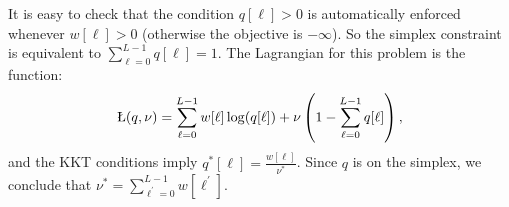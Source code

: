 \documentclass{IEEEtran}
\numberwithin{equation}{section}
\numberwithin{figure}{section}
\theoremstyle{plain}
\theoremstyle{definition}
\theoremstyle{remark}
\theoremstyle{plain}
\theoremstyle{remark}
\theoremstyle{plain}
\theoremstyle{plain}
\theoremstyle{remark}
\begin{document}
It is easy to check that the condition $q[\ell]> 0$ is automatically enforced whenever $w[\ell] > 0$ (otherwise the objective is $-\infty$). So the simplex constraint is equivalent to $\sum_{\ell=0}^{L-1}q[\ell] = 1$. The Lagrangian for this problem is the function:
%
\begin{align*}
%
\L(q,\nu) = \sum_{\ell=0}^{L-1} w[\ell] \log(q[\ell]) + \nu \left(1 - \sum_{\ell=0}^{L-1} q[\ell] \right),
%
\end{align*}
%
and the KKT conditions imply $q^*[\ell] = \frac{w[\ell]}{\nu^*}$.
Since $q$ is on the simplex, we conclude that $\nu^* = \sum_{\ell^\prime=0}^{L-1}w[\ell^\prime]$.
\end{document}
